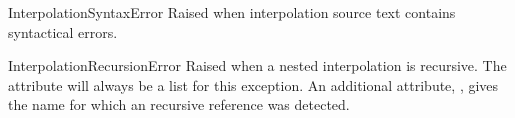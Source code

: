 \documentclass{howto}
\begin{document}
\begin{excdesc}{InterpolationSyntaxError}
  Raised when interpolation source text contains syntactical errors.
\end{excdesc}

\begin{excdesc}{InterpolationRecursionError}
  Raised when a nested interpolation is recursive.  The
   attribute will always be a list for this
  exception.  An additional attribute, , gives the name
  for which an recursive reference was detected.
\end{excdesc}
\end{document}
